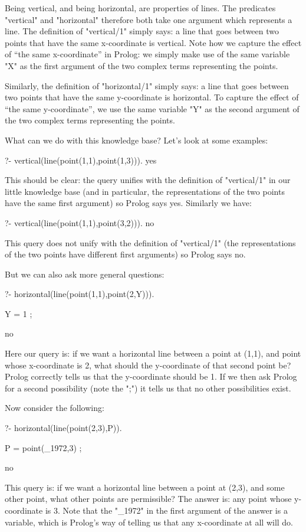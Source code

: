 Being vertical, and being horizontal, are properties of lines. The
predicates "vertical" and "horizontal" therefore both take one
argument which represents a line.  The definition of "vertical/1"
simply says: a line that goes between two points that have the same
x-coordinate is vertical.  Note how we capture the effect of ``the same
x-coordinate'' in Prolog: we simply make use of the same variable "X"
as the first argument of the two complex terms representing the
points.

Similarly, the definition of "horizontal/1" simply says: a line that
goes between two points that have the same y-coordinate is horizontal.
To capture the effect of ``the same y-coordinate'', we use the same
variable "Y" as the second argument of the two complex terms
representing the points.

What can we do with this knowledge base? Let's look at some examples:
\begin{LPNcodedisplay}
?- vertical(line(point(1,1),point(1,3))).
yes
\end{LPNcodedisplay}
%
This should be clear: the query unifies with the definition of
"vertical/1" in our little knowledge base (and in particular, the
representations of the two points have the same first argument) so
Prolog says yes.  Similarly we have:
\begin{LPNcodedisplay}
?- vertical(line(point(1,1),point(3,2))).
no
\end{LPNcodedisplay}
This query does not unify with the definition of "vertical/1" (the
representations of the two points have different first arguments) so
Prolog says no.

But we can also ask more general questions:
\begin{LPNcodedisplay}
?- horizontal(line(point(1,1),point(2,Y))).

Y = 1 ;

no
\end{LPNcodedisplay}
%
Here our query is: if we want a horizontal line between a point at
(1,1), and point whose x-coordinate is 2, what should the y-coordinate
of that second point be?  Prolog correctly tells us that the
y-coordinate should be 1. If we then ask Prolog for a second
possibility (note the ";") it tells us that no other possibilities
exist.

Now consider the following:
\begin{LPNcodedisplay}
?- horizontal(line(point(2,3),P)).

P = point(_1972,3) ;

no
\end{LPNcodedisplay}
%
This query is: if we want a horizontal line between a point at (2,3),
and some other point, what other points are permissible?  The answer
is: any point whose y-coordinate is 3. Note that the "_1972" in the
first argument of the answer is a variable, which is Prolog's way of
telling us that any x-coordinate at all will do.

